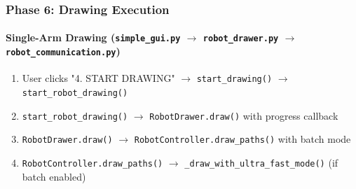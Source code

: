 \documentclass[a4paper,12pt]{article}
\begin{document}
\subsubsection{Phase 6: Drawing Execution}

\paragraph{Single-Arm Drawing (\texttt{simple\_gui.py} $\rightarrow$ \texttt{robot\_drawer.py} $\rightarrow$ \texttt{robot\_communication.py})}
\begin{enumerate}
\item User clicks "4. START DRAWING" $\rightarrow$ \texttt{start\_drawing()} $\rightarrow$ \texttt{start\_robot\_drawing()}
\item \texttt{start\_robot\_drawing()} $\rightarrow$ \texttt{RobotDrawer.draw()} with progress callback
\item \texttt{RobotDrawer.draw()} $\rightarrow$ \texttt{RobotController.draw\_paths()} with batch mode
\item \texttt{RobotController.draw\_paths()} $\rightarrow$ \texttt{\_draw\_with\_ultra\_fast\_mode()} (if batch enabled)
\end{enumerate}
\end{document}

